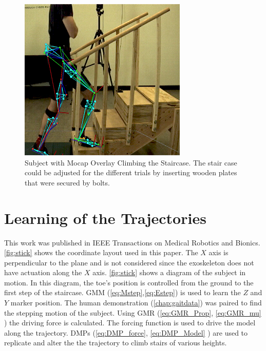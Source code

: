 \begin{figure}
    \centering
    \includegraphics{images/stairs/mocap_overlay_stairs.jpg}
    \caption[Stair Mocap Overlay]{Subject with Mocap Overlay Climbing the Staircase. The stair case could be adjusted for the different trials by inserting wooden plates that were secured by bolts.}
    \label{fig:stairoverlay}
\end{figure}

\section{Learning of the Trajectories}
This work was published in IEEE Transactions on Medical Robotics and Bionics\cite{goldfarb2021towards}. \autoref{fig:stick} shows the coordinate layout used in this paper. The $X$ axis is perpendicular to the plane and is not considered since the exoskeleton does not have actuation along the $X$ axis. \autoref{fig:stick} shows a diagram of the subject in motion. In this diagram, the toe's position is controlled from the ground to the first step of the staircase. GMM (\autoref{eq:Mstep},\autoref{eq:Estep}) is used to learn the $Z$ and $Y$ marker position. The human demonstration (\autoref{chap:gaitdata}) was paired to find the stepping motion of the subject. Using GMR (\autoref{eq:GMR_Prop}, \autoref{eq:GMR_mu} ) the driving force is calculated. The forcing function is used to drive the model along the trajectory. DMPs (\autoref{eq:DMP_force}, \autoref{eq:DMP_Model} ) are used to replicate and alter the the trajectory to climb stairs of various heights.  


